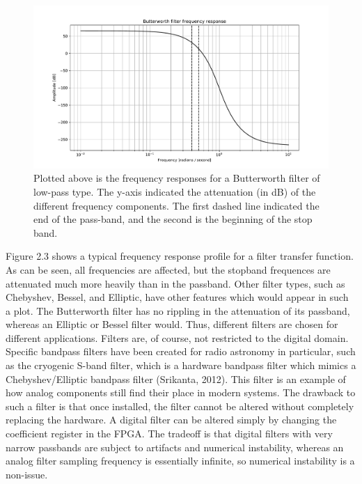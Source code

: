 \documentclass{report}
\begin{document}
\begin{figure}[ht]
\includegraphics[scale=.45]{Figure_2.pdf}
\caption{Plotted above is the frequency responses for a Butterworth filter of low-pass type.  The y-axis indicated the attenuation (in dB) of the different frequency components.  The first dashed line indicated the end of the pass-band, and the second is the beginning of the stop band.}
\end{figure} 

Figure 2.3 shows a typical frequency response profile for a filter transfer function.  As can be seen, all frequencies are affected, but the stopband frequences are attenuated much more heavily than in the passband.  Other filter types, such as Chebyshev, Bessel, and Elliptic, have other features which would appear in such a plot.  The Butterworth filter has no rippling in the attenuation of its passband, whereas an Elliptic or Bessel filter would.  Thus, different filters are chosen for different applications.  
Filters are, of course, not restricted to the digital domain.  Specific bandpass filters have been created for radio astronomy in particular, such as the cryogenic S-band filter, which is a hardware bandpass filter which mimics a Chebyshev/Elliptic bandpass filter (Srikanta, 2012).  This filter is an example of how analog components still find their place in modern systems.  The drawback to such a filter is that once installed, the filter cannot be altered without completely replacing the hardware.  A digital filter can be altered simply by changing the coefficient register in the FPGA.  The tradeoff is that digital filters with very narrow passbands are subject to artifacts and numerical instability, whereas an analog filter sampling frequency is essentially infinite, so numerical instability is a non-issue.  
\end{document}
